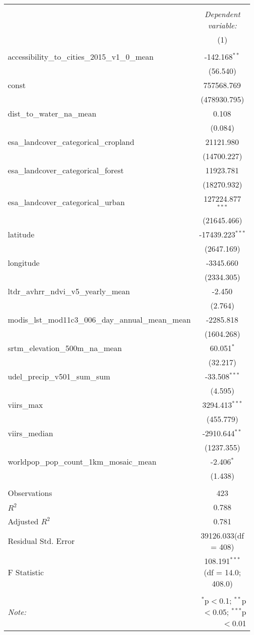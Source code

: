 \begin{table}[!htbp] \centering
\begin{tabular}{@{\extracolsep{5pt}}lc}
\\[-1.8ex]\hline
\hline \\[-1.8ex]
& \multicolumn{1}{c}{\textit{Dependent variable:}} \
\cr \cline{1-2}
\\[-1.8ex] & (1) \\
\hline \\[-1.8ex]
 accessibility_to_cities_2015_v1_0_mean & -142.168$^{**}$ \\
  & (56.540) \\
 const & 757568.769$^{}$ \\
  & (478930.795) \\
 dist_to_water_na_mean & 0.108$^{}$ \\
  & (0.084) \\
 esa_landcover_categorical_cropland & 21121.980$^{}$ \\
  & (14700.227) \\
 esa_landcover_categorical_forest & 11923.781$^{}$ \\
  & (18270.932) \\
 esa_landcover_categorical_urban & 127224.877$^{***}$ \\
  & (21645.466) \\
 latitude & -17439.223$^{***}$ \\
  & (2647.169) \\
 longitude & -3345.660$^{}$ \\
  & (2334.305) \\
 ltdr_avhrr_ndvi_v5_yearly_mean & -2.450$^{}$ \\
  & (2.764) \\
 modis_lst_mod11c3_006_day_annual_mean_mean & -2285.818$^{}$ \\
  & (1604.268) \\
 srtm_elevation_500m_na_mean & 60.051$^{*}$ \\
  & (32.217) \\
 udel_precip_v501_sum_sum & -33.508$^{***}$ \\
  & (4.595) \\
 viirs_max & 3294.413$^{***}$ \\
  & (455.779) \\
 viirs_median & -2910.644$^{**}$ \\
  & (1237.355) \\
 worldpop_pop_count_1km_mosaic_mean & -2.406$^{*}$ \\
  & (1.438) \\
\hline \\[-1.8ex]
 Observations & 423 \\
 $R^2$ & 0.788 \\
 Adjusted $R^2$ & 0.781 \\
 Residual Std. Error & 39126.033(df = 408)  \\
 F Statistic & 108.191$^{***}$ (df = 14.0; 408.0) \\
\hline
\hline \\[-1.8ex]
\textit{Note:} & \multicolumn{1}{r}{$^{*}$p$<$0.1; $^{**}$p$<$0.05; $^{***}$p$<$0.01} \\
\end{tabular}
\end{table}